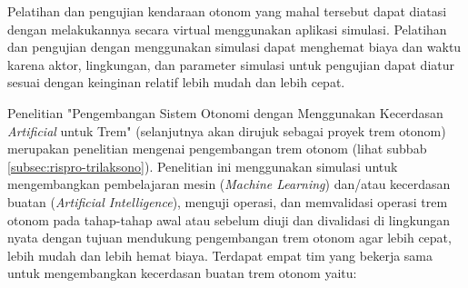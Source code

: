 Pelatihan dan pengujian kendaraan otonom yang mahal tersebut dapat diatasi
dengan melakukannya secara virtual menggunakan aplikasi simulasi. Pelatihan dan
pengujian dengan menggunakan simulasi dapat menghemat biaya dan waktu karena
aktor, lingkungan, dan parameter simulasi untuk pengujian dapat diatur sesuai
dengan keinginan relatif lebih mudah dan lebih cepat.

Penelitian "Pengembangan Sistem Otonomi dengan Menggunakan Kecerdasan
\textit{Artificial} untuk Trem" (selanjutnya akan dirujuk sebagai proyek trem
otonom) merupakan penelitian mengenai pengembangan trem otonom (lihat subbab
\ref{subsec:rispro-trilaksono}). Penelitian ini menggunakan simulasi untuk
mengembangkan pembelajaran mesin (\textit{Machine Learning}) dan/atau kecerdasan
buatan (\textit{Artificial Intelligence}), menguji operasi, dan memvalidasi
operasi trem otonom pada tahap-tahap awal atau sebelum diuji dan divalidasi di
lingkungan nyata dengan tujuan mendukung pengembangan trem otonom agar lebih
cepat, lebih mudah dan lebih hemat biaya. Terdapat empat tim yang bekerja sama
untuk mengembangkan kecerdasan buatan trem otonom yaitu:

